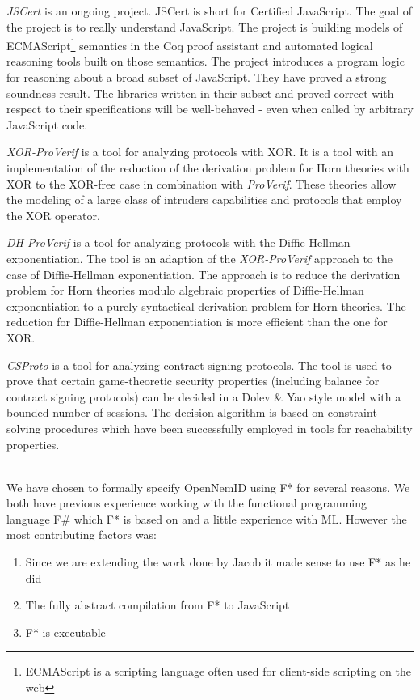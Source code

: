 \documentclass[twosided]{report}
\begin{document}
\par
\emph{JSCert} \cite{jscert} is an ongoing project. JSCert is short for Certified JavaScript. The goal of the project is to really understand JavaScript. The project is building models of ECMAScript\footnote{ECMAScript is a scripting language often used for client-side scripting on the web} semantics in the Coq proof assistant and automated logical reasoning tools built on those semantics. The project introduces a program logic for reasoning about a broad subset of JavaScript. They have proved a strong soundness result. The libraries written in their subset and proved correct with respect to their specifications will be well-behaved - even when called by arbitrary JavaScript code.
\par
\emph{XOR-ProVerif} \cite{xor-proverif} is a tool for analyzing protocols with XOR. It is a tool with an implementation of the reduction of the derivation problem for Horn theories with XOR to the XOR-free case in combination with \emph{ProVerif}. These theories allow the modeling of a large class of intruders capabilities and protocols that employ the XOR operator.
\par
\emph{DH-ProVerif} \cite{dh-proverif} is a tool for analyzing protocols with the Diffie-Hellman exponentiation. The tool is an adaption of the \emph{XOR-ProVerif} approach to the case of Diffie-Hellman exponentiation. The approach is to reduce the derivation problem for Horn theories modulo algebraic properties of Diffie-Hellman exponentiation to a purely syntactical derivation problem for Horn theories. The reduction for Diffie-Hellman exponentiation is more efficient than the one for XOR.
\par
\emph{CSProto} \cite{csproto} is a tool for analyzing contract signing protocols. The tool is used to prove that certain game-theoretic security properties (including balance for contract signing protocols) can be decided in a Dolev \& Yao style model with a bounded number of sessions. The decision algorithm is based on constraint-solving procedures which have been successfully employed in tools for reachability properties.
\\\\
\par
We have chosen to formally specify OpenNemID using F* for several reasons. We both have previous experience working with the functional programming language F\# which F* is based on and a little experience with ML. However the most contributing factors was:
\begin{enumerate}
\item Since we are extending the work done by Jacob it made sense to use F* as he did
\item The fully abstract compilation from F* to JavaScript
\item F* is executable
\end{enumerate}
\end{document}

